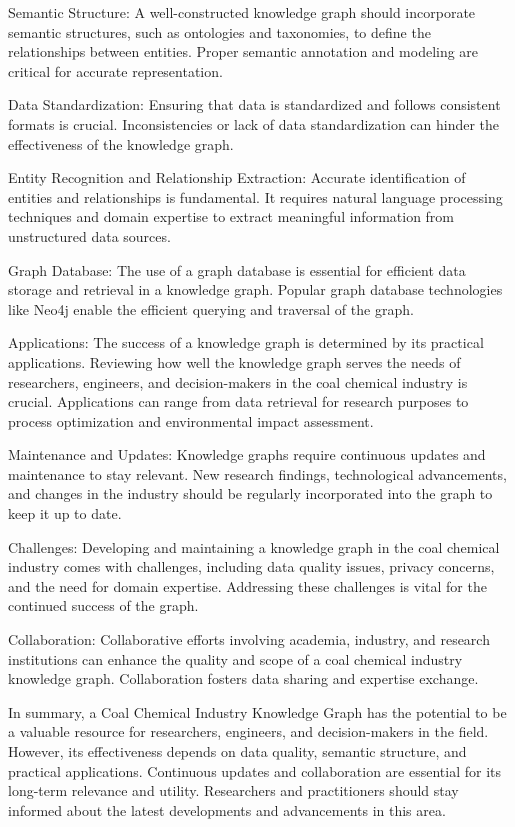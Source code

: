 Semantic Structure: A well-constructed knowledge graph should incorporate semantic structures, such as ontologies and taxonomies, to define the relationships between entities. Proper semantic annotation and modeling are critical for accurate representation.

Data Standardization: Ensuring that data is standardized and follows consistent formats is crucial. Inconsistencies or lack of data standardization can hinder the effectiveness of the knowledge graph.

Entity Recognition and Relationship Extraction: Accurate identification of entities and relationships is fundamental. It requires natural language processing techniques and domain expertise to extract meaningful information from unstructured data sources.

Graph Database: The use of a graph database is essential for efficient data storage and retrieval in a knowledge graph. Popular graph database technologies like Neo4j enable the efficient querying and traversal of the graph.

Applications: The success of a knowledge graph is determined by its practical applications. Reviewing how well the knowledge graph serves the needs of researchers, engineers, and decision-makers in the coal chemical industry is crucial. Applications can range from data retrieval for research purposes to process optimization and environmental impact assessment.

Maintenance and Updates: Knowledge graphs require continuous updates and maintenance to stay relevant. New research findings, technological advancements, and changes in the industry should be regularly incorporated into the graph to keep it up to date.

Challenges: Developing and maintaining a knowledge graph in the coal chemical industry comes with challenges, including data quality issues, privacy concerns, and the need for domain expertise. Addressing these challenges is vital for the continued success of the graph.

Collaboration: Collaborative efforts involving academia, industry, and research institutions can enhance the quality and scope of a coal chemical industry knowledge graph. Collaboration fosters data sharing and expertise exchange.

In summary, a Coal Chemical Industry Knowledge Graph has the potential to be a valuable resource for researchers, engineers, and decision-makers in the field. However, its effectiveness depends on data quality, semantic structure, and practical applications. Continuous updates and collaboration are essential for its long-term relevance and utility. Researchers and practitioners should stay informed about the latest developments and advancements in this area.










